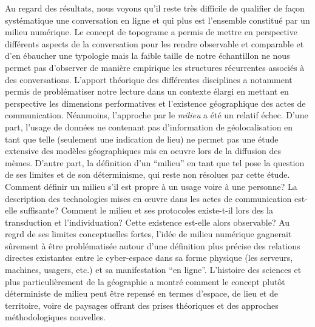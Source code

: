 Au regard des résultats, nous voyons qu{\textquoteright}il reste très difficile de qualifier de fa\c{c}on systématique une conversation en ligne et qui plus est l{\textquoteright}ensemble constitué par un milieu numérique. Le concept de topograme a permis de mettre en perspective différents aspects de la conversation pour les rendre observable et comparable et d{\textquoteright}en ébaucher une typologie mais la faible taille de notre échantillon ne nous permet pas d{\textquoteright}observer de manière empirique les structures récurrentes associés à des conversations. L{\textquoteright}apport théorique des différentes disciplines a notamment permis de problématiser notre lecture dans un contexte élargi en mettant en perspective les dimensions performatives et l{\textquoteright}existence géographique des actes de communication. Néanmoins, l{\textquoteright}approche par le \textit{milieu} a été un relatif échec. D{\textquoteright}une part, l{\textquoteright}usage de données ne contenant pas d{\textquoteright}information de géolocalisation en tant que telle (seulement une indication de lieu) ne permet pas une étude extensive des modèles géographiques mis en oeuvre lors de la diffusion des mèmes. D{\textquoteright}autre part, la définition d{\textquoteright}un {\textquotedblleft}milieu{\textquotedblright} en tant que tel pose la question de ses limites et de son déterminisme, qui reste non résolues par cette étude. Comment définir un milieu s{\textquoteright}il est propre à un usage voire à une personne? La description des technologies mises en {\oe}uvre dans les actes de communication est-elle suffisante? Comment le milieu et ses protocoles existe-t-il lors des la transduction et l{\textquoteright}individuation? Cette existence est-elle alors observable? Au regrd de ses limites conceptuelles fortes, l{\textquoteright}idée de milieu numérique gagnerait s\^urement à être problématisée autour d{\textquoteright}une définition plus précise des relations directes existantes entre le cyber-espace dans sa forme physique (les serveurs, machines, usagers, etc.) et sa manifestation {\textquotedblleft}en ligne{\textquotedblright}. L{\textquoteright}histoire des sciences et plus particulièrement de la géographie a montré comment le concept plut\^ot déterministe de milieu peut être repensé en termes d{\textquoteright}espace, de lieu et de territoire, voire de paysages offrant des prises théoriques et des approches méthodologiques nouvelles.

